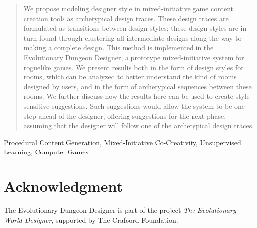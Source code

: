 \documentclass[conference]{IEEEtran}
\begin{document}
\begin{abstract}
We propose modeling designer style in mixed-initiative game content creation tools as archetypical design traces. These design traces are formulated as transitions between design styles; these design styles are in turn found through clustering all intermediate designs along the way to making a complete design. This method is implemented in the Evolutionary Dungeon Designer, a prototype mixed-initiative system for roguelike games. We present results both in the form of design styles for rooms, which can be analyzed to better understand the kind of rooms designed by users, and in the form of archetypical sequences between these rooms. We further discuss how the results here can be used to create style-sensitive suggestions. Such suggestions would allow the system to be one step ahead of the designer, offering suggestions for the next phase, assuming that the designer will follow one of the archetypical design traces.
\end{abstract}


\begin{IEEEkeywords}
Procedural Content Generation, Mixed-Initiative Co-Creativity, Unsupervised Learning, Computer Games
\end{IEEEkeywords}



% 

% 




\section*{Acknowledgment}

The Evolutionary Dungeon Designer is part of the project \textit{The Evolutionary World Designer}, supported by The Crafoord Foundation.



\vspace{12pt}
\end{document}
